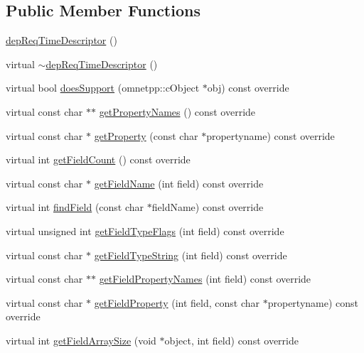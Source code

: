 \subsection*{Public Member Functions}
\begin{DoxyCompactItemize}
\item 
\hyperlink{classdepReqTimeDescriptor_a3a2e6770051714ad9759ccbf1943dbff}{dep\+Req\+Time\+Descriptor} ()
\item 
virtual \hyperlink{classdepReqTimeDescriptor_ab1e88d4e75d0da895acc20d8bbb28f45}{$\sim$dep\+Req\+Time\+Descriptor} ()
\item 
virtual bool \hyperlink{classdepReqTimeDescriptor_a919fa187f7ad370fa29f389841b15310}{does\+Support} (omnetpp\+::c\+Object $\ast$obj) const override
\item 
virtual const char $\ast$$\ast$ \hyperlink{classdepReqTimeDescriptor_a9f361ef5b255d6cf9846e52b67f5e837}{get\+Property\+Names} () const override
\item 
virtual const char $\ast$ \hyperlink{classdepReqTimeDescriptor_a31c4397606ef6ed7e21621d51c4498fb}{get\+Property} (const char $\ast$propertyname) const override
\item 
virtual int \hyperlink{classdepReqTimeDescriptor_a079564e7bacb79e8be6d3af9286ba54b}{get\+Field\+Count} () const override
\item 
virtual const char $\ast$ \hyperlink{classdepReqTimeDescriptor_aa59fd9802c965acfb3876b88f26a2f0d}{get\+Field\+Name} (int field) const override
\item 
virtual int \hyperlink{classdepReqTimeDescriptor_abdf669cde2ee94741db7eaa3bd4a61bf}{find\+Field} (const char $\ast$field\+Name) const override
\item 
virtual unsigned int \hyperlink{classdepReqTimeDescriptor_ab1f3fdc98b07adfe47aecf2a122690ee}{get\+Field\+Type\+Flags} (int field) const override
\item 
virtual const char $\ast$ \hyperlink{classdepReqTimeDescriptor_af28f6a1029b87177e101167d3fc89c3b}{get\+Field\+Type\+String} (int field) const override
\item 
virtual const char $\ast$$\ast$ \hyperlink{classdepReqTimeDescriptor_aa20459216b1c8dfecebfed86c43aa6d2}{get\+Field\+Property\+Names} (int field) const override
\item 
virtual const char $\ast$ \hyperlink{classdepReqTimeDescriptor_aee85faec811f0a52f2d112ea46689d73}{get\+Field\+Property} (int field, const char $\ast$propertyname) const override
\item 
virtual int \hyperlink{classdepReqTimeDescriptor_a4d6a51a338076853385eb86d734319d4}{get\+Field\+Array\+Size} (void $\ast$object, int field) const override

\end{DoxyCompactItemize}
